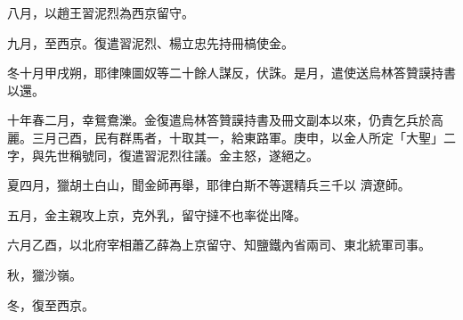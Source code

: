\begin{pinyinscope}
 八月，以趙王習泥烈為西京留守。



 九月，至西京。復遣習泥烈、楊立忠先持冊槁使金。



 冬十月甲戌朔，耶律陳圖奴等二十餘人謀反，伏誅。是月，遣使送烏林答贊謨持書以還。



 十年春二月，幸鴛鴦濼。金復遣烏林答贊謨持書及冊文副本以來，仍責乞兵於高麗。三月己酉，民有群馬者，十取其一，給東路軍。庚申，以金人所定「大聖」二字，與先世稱號同，復遣習泥烈往議。金主怒，遂絕之。



 夏四月，獵胡土白山，聞金師再舉，耶律白斯不等選精兵三千以
 濟遼師。



 五月，金主親攻上京，克外乳，留守撻不也率從出降。



 六月乙酉，以北府宰相蕭乙薛為上京留守、知鹽鐵內省兩司、東北統軍司事。



 秋，獵沙嶺。



 冬，復至西京。



\end{pinyinscope}